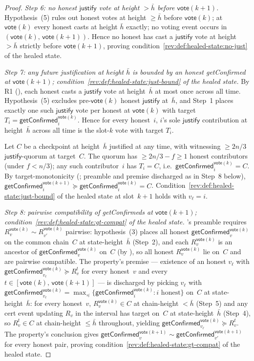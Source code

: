 \ifx\litemode\undefined\documentclass{article}\fi
\newcommand{\just}{\ensuremath{\mathsf{justify}}\xspace}
\newcommand{\vote}{\mathsf{vote}}
\newcommand{\comm}[1]{\bar{#1}}
\newcommand{\getConfirmed}{\textsf{getConfirmed}\xspace}
\theoremstyle{plain}
\theoremstyle{definition}
\theoremstyle{remark}
\begin{document}
\begin{proof}
\emph{Step 6: no honest \just vote at height $> \comm{h}$ before $\vote(k+1)$.}
Hypothesis~(5) rules out honest votes at height $\geq \comm{h}$ before $\vote(k)$; at $\vote(k)$ every honest casts at height $\comm{h}$ exactly; no voting event occurs in $(\vote(k),\, \vote(k+1))$.
Hence no honest has cast a \just vote at height $> \comm{h}$ strictly before $\vote(k+1)$, proving condition~\ref{rev:def:healed-state:no-just} of the healed state.

\emph{Step 7: any future justification at height $\comm{h}$ is bounded by an honest \getConfirmed{} at $\vote(k+1)$; condition~\ref{rev:def:healed-state:just-bound} of the healed state.}
By R1 (), each honest casts a \just vote at height~$\comm{h}$ at most once across all time. Hypothesis~(5) excludes pre-$\vote(k)$ honest \just at~$\comm{h}$, and Step~1 places exactly one such \just vote per honest at $\vote(k)$ with target $T_i = \getConfirmed_i^{\vote(k)}$. Hence for every honest~$i$, $i$'s sole \just contribution at height~$\comm{h}$ across all time is the slot-$k$ vote with target $T_i$.

Let $C$ be a checkpoint at height~$\comm{h}$ justified at any time, with witnessing $\geq 2n/3$ \just-quorum at target~$C$. The quorum has $\geq 2n/3 - f \geq 1$ honest contributors (under $f < n/3$); any such contributor~$i$ has $T_i = C$, i.e.\ $\getConfirmed_i^{\vote(k)} = C$. By target-monotonicity (; preamble and premise discharged as in Step~8 below), $\getConfirmed_i^{\vote(k+1)} \succeq \getConfirmed_i^{\vote(k)} = C$. Condition~\ref{rev:def:healed-state:just-bound} of the healed state at slot~$k+1$ holds with $v_\ell = i$.

\emph{Step 8: pairwise compatibility of \getConfirmed{}s at $\vote(k+1)$; condition~\ref{rev:def:healed-state:gt-compat} of the healed state.}
's preamble requires $R_v^{\vote(k)} \sim R_{v'}^{\vote(k)}$ pairwise: hypothesis~(3) places all honest $\getConfirmed_v^{\vote(k)}$ on the common chain~$C$ at state-height~$\comm{h}$ (Step~2), and each $R_v^{\vote(k)}$ is an ancestor of $\getConfirmed_v^{\vote(k)}$ on~$C$ (by ), so all honest $R_v^{\vote(k)}$ lie on~$C$ and are pairwise compatible.
The property's premise — existence of an honest $v_\ell$ with $\getConfirmed_{v_\ell}^{\vote(k)} \succeq R_v^t$ for every honest~$v$ and every $t \in [\vote(k),\, \vote(k+1)]$ — is discharged by picking $v_\ell$ with $\getConfirmed_{v_\ell}^{\vote(k)} = \max_\preceq \{\getConfirmed_i^{\vote(k)} : i \text{ honest}\}$ on~$C$ at state-height~$\comm{h}$: for every honest~$v$, $R_v^{\vote(k)} \in C$ at chain-height $< \comm{h}$ (Step~5) and any cert event updating $R_v$ in the interval has target on~$C$ at state-height~$\comm{h}$ (Step~4), so $R_v^t \in C$ at chain-height $\leq \comm{h}$ throughout, yielding $\getConfirmed_{v_\ell}^{\vote(k)} \succeq R_v^t$.
The property's conclusion gives $\getConfirmed_v^{\vote(k+1)} \sim \getConfirmed_{v'}^{\vote(k+1)}$ for every honest pair, proving condition~\ref{rev:def:healed-state:gt-compat} of the healed state.


\end{proof}
\end{document}

